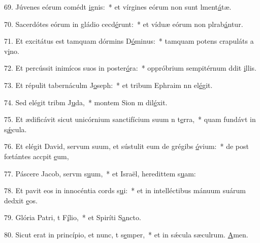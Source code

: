 69. Júvenes eórum comédt \uline{i}gnis:~* et vírgines eórum non sunt lment\uline{á}tæ.\par 
70. Sacerdótes eórum in gládio cecd\uline{é}runt:~* et víduæ eórum non plrab\uline{á}ntur.\par 
71. Et excitátus est tamquam dórmins D\uline{ó}minus:~* tamquam potens crapuláts a v\uline{i}no.\par 
72. Et percússit inimícos suos in poster\uline{ó}ra:~* oppróbrium sempitérnum ddit \uline{i}llis.\par 
73. Et répulit tabernáculm J\uline{o}seph:~* et tribum Ephraim nn el\uline{é}git.\par 
74. Sed elégit tribm J\uline{u}da,~* montem Sion m dil\uline{é}xit.\par 
75. Et ædificávit sicut unicórnium sanctifícium suum n t\uline{e}rra,~* quam fundávt in s\uline{ǽ}cula.\par 
76. Et elégit David, servum suum, et sústulit eum de grégibs \uline{ó}vium:~* de post fœtántes accpit \uline{e}um,\par 
77. Páscere Jacob, servm s\uline{u}um,~* et Israël, heredittem s\uline{u}am:\par 
78. Et pavit eos in innocéntia cords s\uline{u}i:~* et in intelléctibus mánuum suárum dedxit \uline{e}os.\par 
79. Glória Patri, t F\uline{í}lio,~* et Spiríti S\uline{a}ncto.\par 
80. Sicut erat in princípio, et nunc, t s\uline{e}mper,~* et in sǽcula sæculrum. \uline{A}men.\par 
